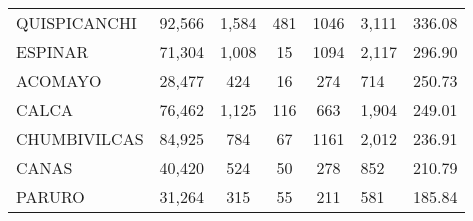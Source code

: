\begin{tabular}{lrccclr}
	\cellcolor[HTML]{FFE699}QUISPICANCHI                           & 92,566                                                         & 1,584                                                       & 481                  & 1046                     & 3,111                                                               & 336.08                                                                       \\
	\cellcolor[HTML]{FFE699}ESPINAR                                & 71,304                                                         & 1,008                                                       & 15                   & 1094                     & 2,117                                                               & 296.90                                                                       \\
	\cellcolor[HTML]{FFE699}ACOMAYO                                & 28,477                                                         & 424                                                         & 16                   & 274                      & 714                                                                 & 250.73                                                                       \\
	\cellcolor[HTML]{FFE699}CALCA                                  & 76,462                                                         & 1,125                                                       & 116                  & 663                      & 1,904                                                               & 249.01                                                                       \\
	\cellcolor[HTML]{FFE699}CHUMBIVILCAS                           & 84,925                                                         & 784                                                         & 67                   & 1161                     & 2,012                                                               & 236.91                                                                       \\
	\cellcolor[HTML]{C6E0B4}CANAS                                  & 40,420                                                         & 524                                                         & 50                   & 278                      & 852                                                                 & 210.79                                                                       \\
	\cellcolor[HTML]{C6E0B4}PARURO                                 & 31,264                                                         & 315                                                         & 55                   & 211                      & 581                                                                 & 185.84                                                                       \\

\end{tabular}
